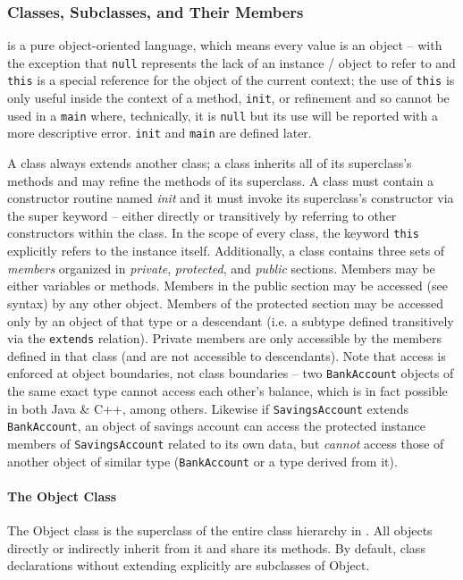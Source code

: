 \subsubsection{Classes, Subclasses, and Their Members}
\Lang{} is a pure object-oriented language, which means every value is an object -- with the exception that \verb!null! represents the lack of an instance / object to refer to and \verb!this! is a special reference for the object of the current context; the use of \verb!this! is only useful inside the context of a method, \verb!init!, or refinement and so cannot be used in a \verb!main! where, technically, it is \verb!null! but its use will be reported with a more descriptive error. \verb!init! and \verb!main! are defined later.

A class always extends another class; a class inherits all of its superclass's methods and may refine the methods of its superclass. A class must contain a constructor routine named \textit{init} and it must invoke its superclass's constructor via the super keyword -- either directly or transitively by referring to other constructors within the class. In the scope of every class, the keyword \verb!this! explicitly refers to the instance itself. Additionally, a class contains three sets of \textit{members} organized in \textit{private}, \textit{protected}, and \textit{public} sections. Members may be either variables or methods. Members in the public section may be accessed (see syntax) by any other object. Members of the protected section may be accessed only by an object of that type or a descendant (i.e. a subtype defined transitively via the \verb!extends! relation). Private members are only accessible by the members defined in that class (and are not accessible to descendants). Note that access is enforced at object boundaries, not class boundaries -- two \verb!BankAccount! objects of the same exact type cannot access each other's balance, which is in fact possible in both Java \& C++, among others. Likewise if \verb!SavingsAccount! extends \verb!BankAccount!, an object of savings account can access the protected instance members of \verb!SavingsAccount! related to its own data, but \emph{cannot} access those of another object of similar type (\verb!BankAccount! or a type derived from it).

\paragraph{The Object Class}
The Object class is the superclass of the entire class hierarchy in \Lang{}. All objects directly or indirectly inherit from it and share its methods. By default, class declarations without extending explicitly are subclasses of Object.

